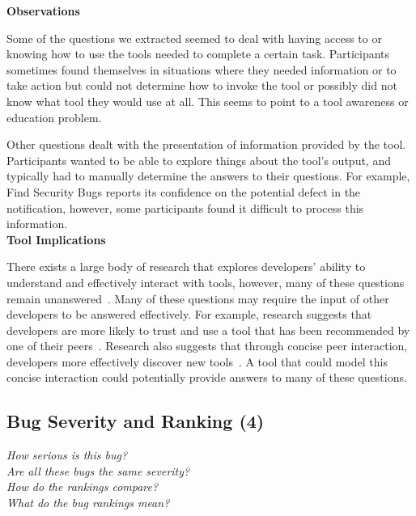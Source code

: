 \documentclass[conference]{IEEEtran}
\begin{document}
\noindent\textbf{Observations}

Some of the questions we extracted seemed to deal with having access to or knowing how to use the tools needed to complete a certain task. 
Participants sometimes found themselves in situations where they needed information or to take action but could not determine how to invoke the tool or possibly did not know what tool they would use at all. 
This seems to point to a tool awareness or education problem.

Other questions dealt with the presentation of information provided by the tool. 
Participants wanted to be able to explore things about the tool's output, and typically had to manually determine the answers to their questions. 
For example, Find Security Bugs reports its confidence on the potential defect in the notification, however, some participants found it difficult to process this information.
\\


\noindent\textbf{Tool Implications}

There exists a large body of research that explores developers' ability to understand and effectively interact with tools, however, many of these questions remain unanswered~\cite{ko2004designing, khoo2008path, johnson2013don}. 
Many of these questions may require the input of other developers to be answered effectively. 
For example, research suggests that developers are more likely to trust and use a tool that has been recommended by one of their peers~\cite{murphy2010trust}.
Research also suggests that through concise peer interaction, developers more effectively discover new tools~\cite{murphy2011peer}. 
A tool that could model this concise interaction could potentially provide answers to many of these questions.





\noindent\subsection{\textbf{Bug Severity and Ranking (4)}}\label{bsr}

\noindent\emph{How serious is this bug?} \\
\emph{Are all these bugs the same severity?} \\
\emph{How do the rankings compare?} \\
\emph{What do the bug rankings mean?} \\
\end{document}
